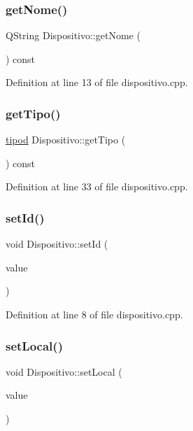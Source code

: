 \subsubsection{\texorpdfstring{get\+Nome()}{getNome()}}
{\footnotesize\ttfamily Q\+String Dispositivo\+::get\+Nome (\begin{DoxyParamCaption}{ }\end{DoxyParamCaption}) const}



Definition at line 13 of file dispositivo.\+cpp.

\hypertarget{class_dispositivo_a0242efd1a66cffb9e979432e941d68ca}{}\label{class_dispositivo_a0242efd1a66cffb9e979432e941d68ca} 
\subsubsection{\texorpdfstring{get\+Tipo()}{getTipo()}}
{\footnotesize\ttfamily \hyperlink{classtipod}{tipod} Dispositivo\+::get\+Tipo (\begin{DoxyParamCaption}{ }\end{DoxyParamCaption}) const}



Definition at line 33 of file dispositivo.\+cpp.

\hypertarget{class_dispositivo_a186a8fdf627e6e9326a196fa7ad59846}{}\label{class_dispositivo_a186a8fdf627e6e9326a196fa7ad59846} 
\subsubsection{\texorpdfstring{set\+Id()}{setId()}}
{\footnotesize\ttfamily void Dispositivo\+::set\+Id (\begin{DoxyParamCaption}\item[{int}]{value }\end{DoxyParamCaption})}



Definition at line 8 of file dispositivo.\+cpp.

\hypertarget{class_dispositivo_a033c98bd8e7be483677b06ead506fe9d}{}\label{class_dispositivo_a033c98bd8e7be483677b06ead506fe9d} 
\subsubsection{\texorpdfstring{set\+Local()}{setLocal()}}
{\footnotesize\ttfamily void Dispositivo\+::set\+Local (\begin{DoxyParamCaption}\item[{const Q\+String \&}]{value }\end{DoxyParamCaption})}




